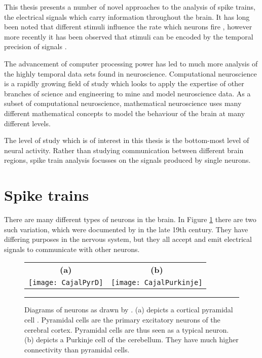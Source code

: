 This thesis presents a number of novel approaches to the analysis of spike trains, the electrical signals which carry information throughout the brain. It has long been noted that different stimuli influence the rate which neurons fire \citep{Knight1972a}, however more recently it has been observed that stimuli can be encoded by the temporal precision of signals \citep{HopkinsBass1981a,EngelEtAl1992a}.
 
The advancement of computer processing power has led to much more analysis of the highly temporal data sets found in neuroscience. Computational neuroscience is a rapidly growing field of study which looks to apply the expertise of other branches of science and engineering to mine and model neuroscience data.  As a subset of computational neuroscience, mathematical neuroscience uses many different mathematical concepts to model the behaviour of the brain at many different levels.
 
The level of study which is of interest in this thesis is the bottom-most level of neural activity.  Rather than studying communication between different brain regions, spike train analysis focusses on the signals produced by single neurons.


\section{Spike trains}

There are many different types of neurons in the brain. In Figure \ref{Cajal} there are two such variation, which were documented by \citet{Cajal1894a} in the late 19th century.  They have differing purposes in the nervous system, but they all accept and emit electrical signals to communicate with other neurons.

\begin{figure}
\begin{center}
\begin{tabular}{cc}
{\bf (a)} & {\bf (b)} \\
\texttt{[image: CajalPyrD]} & \texttt{[image: CajalPurkinje]}
\end{tabular}
\bigskip
\rule{35em}{0.5pt}
\caption{\label{Cajal} Diagrams of neurons as drawn by \citet{Cajal1894a}.  (a) depicts a cortical pyramidal cell .  Pyramidal cells are the primary excitatory neurons of the cerebral cortex.  Pyramidal cells are thus seen as a typical neuron.  (b) depicts a Purkinje cell of the cerebellum. They have much higher connectivity than pyramidal cells.}
\end{center}
\end{figure} 


